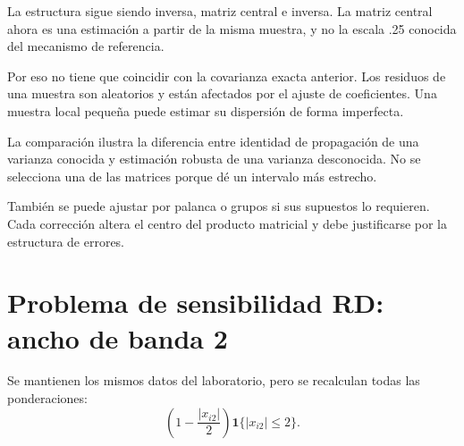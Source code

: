 \documentclass[11pt,a4paper]{article}
\begin{document}
La estructura sigue siendo inversa,
matriz central e inversa.
La matriz central ahora es una estimación
a partir de la misma muestra,
y no la escala .25 conocida
del mecanismo de referencia.

Por eso no tiene que coincidir
con la covarianza exacta anterior.
Los residuos de una muestra
son aleatorios y están afectados
por el ajuste de coeficientes.
Una muestra local pequeña puede
estimar su dispersión de forma imperfecta.

La comparación ilustra la diferencia
entre identidad de propagación de una
varianza conocida y estimación robusta
de una varianza desconocida.
No se selecciona una de las matrices
porque dé un intervalo más estrecho.

También se puede ajustar por palanca
o grupos si sus supuestos lo requieren.
Cada corrección altera el centro del
producto matricial y debe justificarse
por la estructura de errores.

\clearpage
\section{Problema de sensibilidad RD: ancho de banda 2}\label{unidad57}
Se mantienen los mismos datos del laboratorio,
pero se recalculan todas las ponderaciones:
\[
\left(1-\frac{|x_{i2}|}{2}\right)
\mathbf1\{|x_{i2}|\le2\}.
\]
\end{document}
